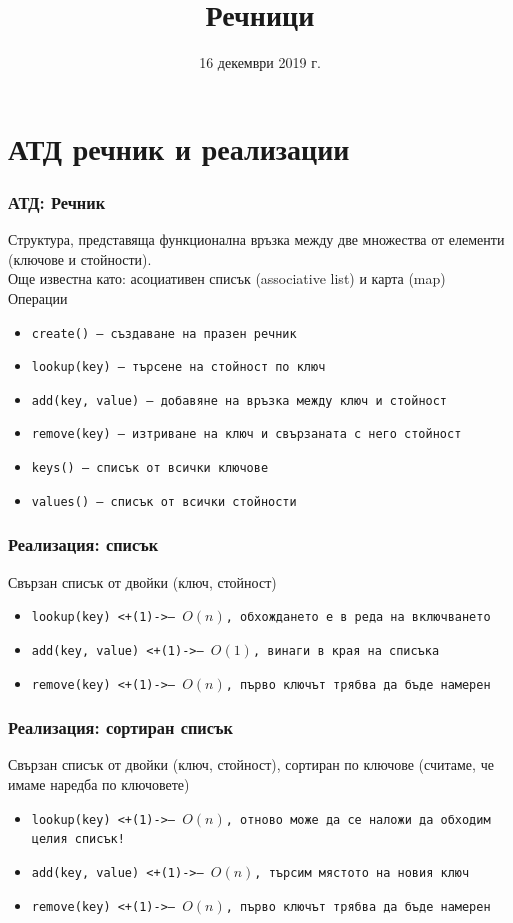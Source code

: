 \documentclass[alsotrans]{beamerswitch}
\title{Речници}
\date{16 декември 2019 г.}
\begin{document}
\begin{frame}
  \titlepage
\end{frame}

\section{АТД речник и реализации}

\begin{frame}
  \frametitle{АТД: Речник}
  Структура, представяща функционална връзка между две множества от елементи (ключове и стойности).\\[1em]
  \pause
  Още известна като: асоциативен списък (associative list) и карта (map)\\[1em]
  \pause
  Операции
  \begin{itemize}
  \item \tt{create()} --- създаване на празен речник
  \item \tt{lookup(key)} --- търсене на стойност по ключ
  \item \tt{add(key, value)} --- добавяне на връзка между ключ и стойност
  \item \tt{remove(key)} --- изтриване на ключ и свързаната с него стойност
  \item \tt{keys()} --- списък от всички ключове
  \item \tt{values()} --- списък от всички стойности
  \end{itemize}
\end{frame}

\begin{frame}
  \frametitle{Реализация: списък}
  Свързан списък от двойки (ключ, стойност)
  \pause
  \begin{itemize}
  \item \tt{lookup(key)} \onslide<+(1)->{--- $O(n)$, обхождането е в реда на включването}
  \item \tt{add(key, value)} \onslide<+(1)->{--- $O(1)$, винаги в края на списъка}
  \item \tt{remove(key)} \onslide<+(1)->{--- $O(n)$, първо ключът трябва да бъде намерен}
  \end{itemize}
\end{frame}

\begin{frame}
  \frametitle{Реализация: сортиран списък}
  Свързан списък от двойки (ключ, стойност), сортиран по ключове (считаме, че имаме наредба по ключовете)
  \pause
  \begin{itemize}
  \item \tt{lookup(key)} \onslide<+(1)->{--- $O(n)$, отново може да се наложи да обходим целия списък!}
  \item \tt{add(key, value)} \onslide<+(1)->{--- \alert{$O(n)$}, търсим мястото на новия ключ}
  \item \tt{remove(key)} \onslide<+(1)->{--- $O(n)$, първо ключът трябва да бъде намерен}
  \end{itemize}
\end{frame}
\end{document}
